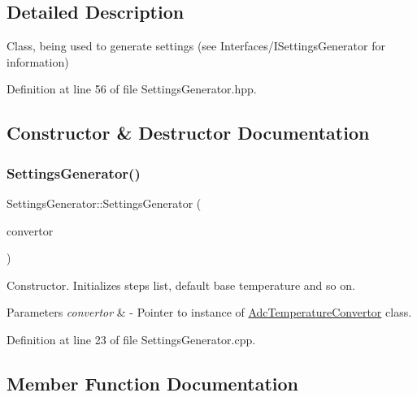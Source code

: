 \subsection{Detailed Description}
Class, being used to generate settings (see Interfaces/\+I\+Settings\+Generator for information) 

Definition at line 56 of file Settings\+Generator.\+hpp.



\subsection{Constructor \& Destructor Documentation}
\mbox{\label{class_settings_generator_a063e189547011b62a567ff55446341d7}} 
\subsubsection{\texorpdfstring{Settings\+Generator()}{SettingsGenerator()}}
{\footnotesize\ttfamily Settings\+Generator\+::\+Settings\+Generator (\begin{DoxyParamCaption}\item[{\hyperlink{class_interfaces_1_1_i_adc_temperature_convertor}{Interfaces\+::\+I\+Adc\+Temperature\+Convertor} $\ast$}]{convertor }\end{DoxyParamCaption})}



Constructor. Initializes steps list, default base temperature and so on. 


\begin{DoxyParams}{Parameters}
{\em convertor} & -\/ Pointer to instance of \hyperlink{class_adc_temperature_convertor}{Adc\+Temperature\+Convertor} class. \\
\hline
\end{DoxyParams}


Definition at line 23 of file Settings\+Generator.\+cpp.



\subsection{Member Function Documentation}
\mbox{\label{class_settings_generator_a99bbe6e67e638ccc7bf6b21b3bc36135}} 
